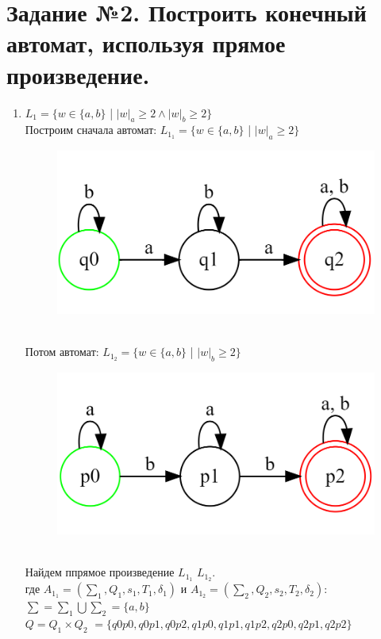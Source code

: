 \documentclass[a4paper]{article}
\begin{document}
\section{Задание №2. Построить конечный автомат, используя прямое произведение.}
\begin{enumerate}
\item {$L_1 = \{ w \in \{a,b\}  $ | $  {|w|_a} \ge 2  \wedge   {|w|_b} \ge 2 \} $}\\
Построим сначала автомат: 
$L_1_1 = \{ w \in \{a,b\}  $ | $  {|w|_a} \ge 2 \} $
\begin{figure}[h]
\centering
\includegraphics[width=12cm]{Задание_№2_1_2.png}
\end{figure}
\\Потом автомат:
$L_1_2 = \{ w \in \{a,b\}  $ | $  {|w|_b} \ge 2 \} $
\begin{figure}[h]
\centering
\includegraphics[width=12cm]{Задание_№2_1_1.png}
\end{figure}
\\Найдем ппрямое произведение $L_1_1$ \cap $L_1_2$.
\\где  $A_1_1 = (\sum_1 , Q_1, s_1, T_1, \delta_1) $ и  $A_1_2 = (\sum_2 , Q_2, s_2, T_2, \delta_2)$:\\
\hfill \break
$\sum = \sum_1 \bigcup \sum_2 = \{a, b\}$\\
$Q = Q_1 \times Q_2$ $= \{q0p0, q0p1, q0p2, q1p0, q1p1, q1p2, q2p0, q2p1, q2p2 \}$\\

\end{enumerate}
\end{document}
